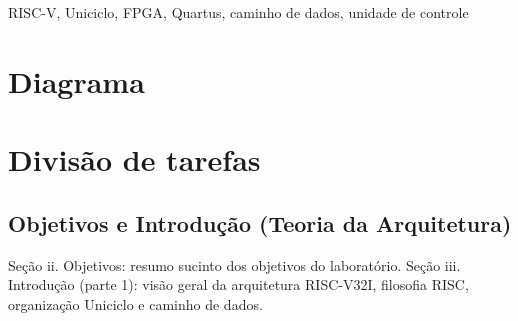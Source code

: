 \documentclass[conference]{IEEEtran}
\begin{document}
\begin{abstract}
No presente trabalho é apresentado o desenvolvimento da Unidade Operativa Uniciclo da arquitetura
RISC-V32I, implementada na plataforma Quartus. O projeto contempla os módulos que compõem o caminho de
dados (\textit{datapath}), as memórias de instrução e de dados em organização Harvard, a unidade de
controle principal e a unidade de controle da ULA, de forma a executar automaticamente um conjunto de
instruções de 32 bits pré-compiladas no formato MIF. Além do conjunto básico de referência da literatura
(Tipo-R, \texttt{lw}, \texttt{sw} e \texttt{beq}), foram implementadas as instruções de salto e de
formação de constantes (\texttt{jal}, \texttt{jalr}, \texttt{lui} e \texttt{auipc}), o que exigiu a
extensão do caminho de dados clássico com novos sinais de controle e novos multiplexadores. O trabalho
inclui a descrição da arquitetura desenvolvida, do conjunto de instruções suportado, dos procedimentos e
métodos adotados, dos resultados obtidos por meio do ambiente de simulação da forma de onda, seguidos de uma análise 
crítica dos resultados e das principais
dificuldades de implementação e depuração enfrentadas, em especial nas instruções de salto e no
tratamento de endereços fora da região válida da memória de instruções.
\end{abstract}

\begin{IEEEkeywords}
RISC-V, Uniciclo, FPGA, Quartus, caminho de dados, unidade de controle
\end{IEEEkeywords}


\section{Diagrama}

\section{Divisão de tarefas}

\subsection{Objetivos e Introdução (Teoria da Arquitetura)}
Seção ii. Objetivos: resumo sucinto dos objetivos do laboratório.
Seção iii. Introdução (parte 1): visão geral da arquitetura RISC-V32I, filosofia RISC, organização
Uniciclo e caminho de dados.
\end{document}
